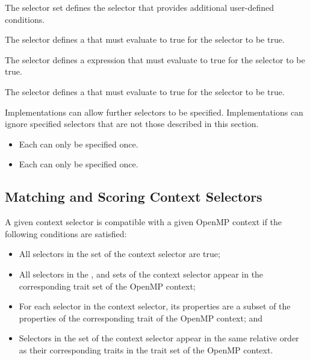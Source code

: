 The  selector set defines the  selector that provides 
additional user-defined conditions.

\begin{cspecific}
The \code{)} selector defines a  that must evaluate to true for the selector to be true.
\end{cspecific}

\begin{cppspecific}
The \code{)} selector defines a  
expression that must evaluate to true for the selector to be true.
\end{cppspecific}

\begin{fortranspecific}
The \code{)} selector defines a  that must evaluate to true for the selector to be true.
\end{fortranspecific}

Implementations can allow further selectors to be specified. Implementations can 
ignore specified selectors that are not those described in this section.

\restrictions
\begin{itemize}
 \item Each  can only be specified once.
 \item Each  can only be specified once.
\end{itemize}

\subsection{Matching and Scoring Context Selectors}
\label{subsec:Matching and Scoring Context Selectors}

A given context selector is compatible with a given OpenMP context if the
following conditions are satisfied:

\begin{itemize}
\item All selectors in the  set of the context selector are true;
\item All selectors in the ,  and  
      sets of the context selector appear in the corresponding trait set of the 
      OpenMP context;
\item For each selector in the context selector, its properties are a subset of 
      the properties of the corresponding trait of the OpenMP context; and
\item Selectors in the  set of the context selector appear 
      in the same relative order as their corresponding traits in the 
       trait set of the OpenMP context.
\end{itemize}

